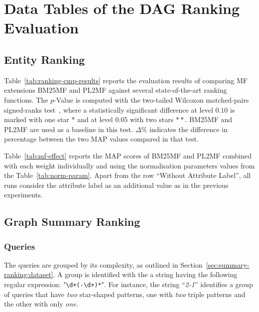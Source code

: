 \chapter{Data Tables of the DAG Ranking Evaluation}

\section{Entity Ranking}

Table~\ref{tab:ranking-cmp-results} reports the evaluation results of comparing MF extensions BM25MF and PL2MF against several state-of-the-art ranking functions. The $p$-Value is computed with the two-tailed Wilcoxon matched-pairs signed-ranks test~\cite{sheskin:2003:CRC,buttcher:2010:IRI:1869919}, where a statistically significant difference at level $0.10$ is marked with one star $*$ and at level $0.05$ with two stars $**$. BM25MF and PL2MF are used as a baseline in this test. $\Delta\%$ indicates the difference in percentage between the two MAP values compared in that test.




Table~\ref{tab:mf-effect} reports the MAP scores of BM25MF and PL2MF combined with each weight individually and using the normalisation parameters values from the Table~\ref{tab:norm-param}. Apart from the row ``Without Attribute Label'', all runs consider the attribute label as an additional value as in the previous experiments.



\section{Graph Summary Ranking}
\label{app:summary-ranking}

\subsection{Queries}

The queries are grouped by its complexity, as outlined in Section~\ref{sec:summary-ranking:dataset}. A group is identified with the a string having the following regular expression: "\verb/\d+(-\d+)*/". For instance, the string ``\emph{2-1}'' identifies a group of queries that have \textit{two} star-shaped patterns, one with \textit{two} triple patterns and the other with only \textit{one}.

